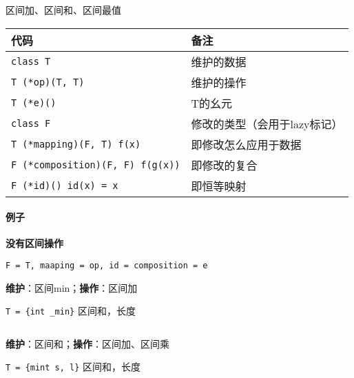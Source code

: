 区间加、区间和、区间最值

\begin{tabular}{ll}
    \hline
    代码                                    & 备注               \\
    \hline
    \verb|class T|                        & 维护的数据            \\
    \verb|T (*op)(T, T)|                  & 维护的操作            \\
    \verb|T (*e)()|                       & T的幺元             \\
    \verb|class F|                        & 修改的类型（会用于lazy标记） \\
    \verb|T (*mapping)(F, T) f(x)|        & 即修改怎么应用于数据       \\
    \verb|F (*composition)(F, F) f(g(x))| & 即修改的复合           \\
    \verb|F (*id)() id(x) = x|            & 即恒等映射            \\
    \hline
\end{tabular}

\paragraph{例子}

\textbf{没有区间操作}

\verb|F = T, maaping = op, id = composition = e|

\textbf{维护}：区间min；\textbf{操作}：区间加

\verb|T = {int _min}| 区间和，长度

\inputminted{cpp}{src/src/segtree_eg1.txt}

\textbf{维护}：区间和；\textbf{操作}：区间加、区间乘

\verb|T = {mint s, l}| 区间和，长度

\inputminted{cpp}{src/src/segtree_eg2.txt}
